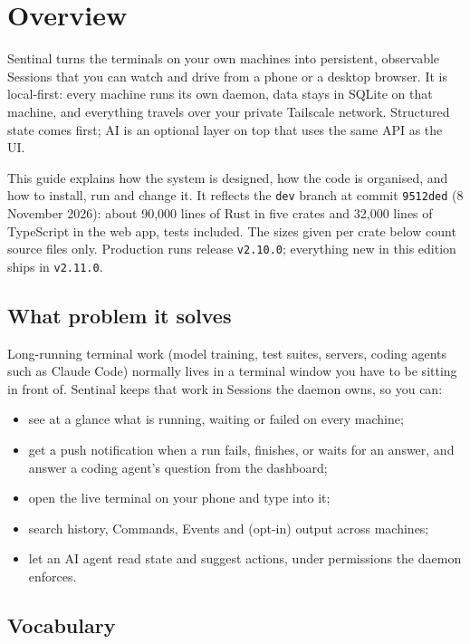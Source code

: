

\chapter{\texorpdfstring{Overview}{Overview}}

Sentinal turns the terminals on your own machines into persistent, observable Sessions that you can watch and drive from a phone or a desktop browser. It is local-first: every machine runs its own daemon, data stays in SQLite on that machine, and everything travels over your private Tailscale network. Structured state comes first; AI is an optional layer on top that uses the same API as the UI.

This guide explains how the system is designed, how the code is organised, and how to install, run and change it. It reflects the \texttt{dev} branch at commit \texttt{9512ded} (8 November 2026): about 90,000 lines of Rust in five crates and 32,000 lines of TypeScript in the web app, tests included. The sizes given per crate below count source files only. Production runs release \texttt{v2.10.0}; everything new in this edition ships in \texttt{v2.11.0}.

\section{\texorpdfstring{What problem it solves}{What problem it solves}}

Long-running terminal work (model training, test suites, servers, coding agents such as Claude Code) normally lives in a terminal window you have to be sitting in front of. Sentinal keeps that work in Sessions the daemon owns, so you can:

\begin{itemize}
\item see at a glance what is running, waiting or failed on every machine;
\item get a push notification when a run fails, finishes, or waits for an answer, and answer a coding agent's question from the dashboard;
\item open the live terminal on your phone and type into it;
\item search history, Commands, Events and (opt-in) output across machines;
\item let an AI agent read state and suggest actions, under permissions the daemon enforces.
\end{itemize}

\section{\texorpdfstring{Vocabulary}{Vocabulary}}

